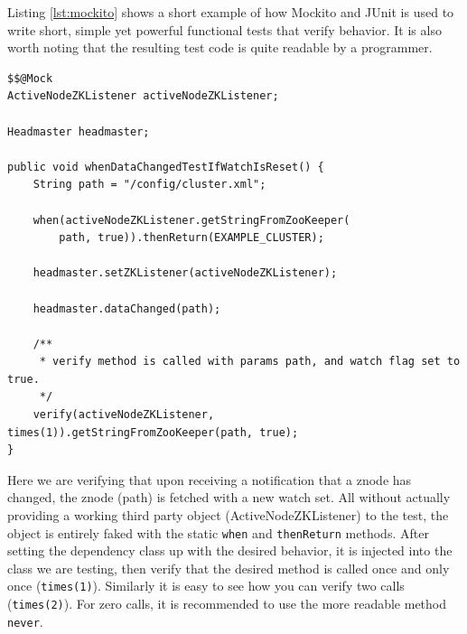Listing \ref{lst:mockito} shows a short example of how Mockito and JUnit is used to write short, simple yet powerful functional tests that verify behavior. It is also worth noting that the resulting test code is quite readable by a programmer.

\begin{lstlisting}[style=customjava,label=lst:mockito,caption={Test code utilizing Mockito. Think of the \texttt{@Mock} class as a subclass with all methods overrided \texttt{return null;}.}]
$$@Mock
ActiveNodeZKListener activeNodeZKListener;

Headmaster headmaster;

public void whenDataChangedTestIfWatchIsReset() {
    String path = "/config/cluster.xml";

    when(activeNodeZKListener.getStringFromZooKeeper(
    	path, true)).thenReturn(EXAMPLE_CLUSTER);

    headmaster.setZKListener(activeNodeZKListener);

    headmaster.dataChanged(path);

    /** 
     * verify method is called with params path, and watch flag set to true.
     */
    verify(activeNodeZKListener, times(1)).getStringFromZooKeeper(path, true);
}

\end{lstlisting}

Here we are verifying that upon receiving a notification that a znode has changed, the znode (path) is fetched with a new watch set.
All without actually providing a working third party object (ActiveNodeZKListener) to the test, the object is entirely faked with the static \texttt{when} and \texttt{thenReturn} methods. After setting the dependency class up with the desired behavior, it is injected into the class we are testing, then verify that the desired method is called once and only once (\texttt{times(1)}). Similarly it is easy to see how you can verify two calls (\texttt{times(2)}). For zero calls, it is recommended to use the more readable method \texttt{never}.
